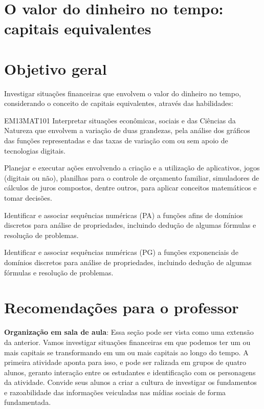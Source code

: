 \begin{paginatexto2}

\section*{O valor do dinheiro no tempo: capitais equivalentes}

\section*{Objetivo geral}

Investigar situações financeiras que envolvem o valor do dinheiro no tempo, considerando o conceito de capitais equivalentes, através das habilidades:

\begin{objetivos}{EM13MAT101}
 Interpretar situações econômicas, sociais e das Ciências da Natureza
que envolvem a variação de duas grandezas, pela análise dos gráficos das funções representadas e das taxas de variação com ou sem apoio de tecnologias digitais.

Planejar e executar ações envolvendo a criação e a utilização de aplicativos, jogos (digitais ou não), planilhas para o controle de orçamento familiar, simuladores de cálculos de juros compostos, dentre outros, para aplicar conceitos matemáticos e tomar decisões. 

Identificar e associar sequências numéricas (PA) a funções afins de domínios discretos para análise de propriedades, incluindo dedução de algumas fórmulas e resolução de problemas.

Identificar e associar sequências numéricas (PG) a funções exponenciais de domínios discretos para análise de propriedades, incluindo dedução de algumas fórmulas e resolução de problemas.
\end{objetivos}

\section*{Recomendações para o professor}

\textbf{Organização em sala de aula}: Essa seção pode ser vista como uma extensão da anterior. Vamos investigar situações financeiras em que podemos ter um ou mais capitais se transformando em um ou mais capitais ao longo do tempo. A primeira atividade aponta para isso, e pode ser ralizada em grupos de quatro alunos, geranto interação entre os estudantes e identificação com os personagens da atividade. Convide seus alunos a criar a cultura de investigar os fundamentos e razoabilidade das informações veiculadas nas mídias sociais de forma fundamentada.


\end{paginatexto2}
